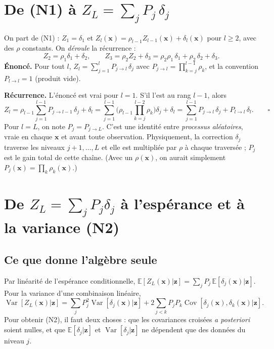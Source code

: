 \documentclass[10pt,a4paper]{article}
\newcommand{\vx}{\bm{x}}
\newcommand{\vz}{\bm{z}}
\DeclareMathOperator{\Var}{Var}
\DeclareMathOperator{\Cov}{Cov}
\begin{document}
\section{De (N1) à $Z_L=\sum_j P_j\,\delta_j$}\label{sec:deroule}
On part de (N1) : $Z_1=\delta_1$ et $Z_l(\vx)=\rho_{l-1}Z_{l-1}(\vx)+\delta_l(\vx)$ pour $l\ge2$, avec des
$\rho$ constants. On \emph{déroule} la récurrence :
\[
  Z_2=\rho_1\delta_1+\delta_2,\qquad
  Z_3=\rho_2 Z_2+\delta_3=\rho_2\rho_1\,\delta_1+\rho_2\,\delta_2+\delta_3 .
\]
\textbf{Énoncé.} Pour tout $l$, $Z_l=\sum_{j=1}^{l}P_{j\to l}\,\delta_j$ avec
$P_{j\to l}=\prod_{k=j}^{l-1}\rho_k$, et la convention $P_{l\to l}=1$ (produit vide).

\textbf{Récurrence.} L'énoncé est vrai pour $l=1$. S'il l'est au rang $l-1$, alors
\[
  Z_l=\rho_{l-1}\sum_{j=1}^{l-1}P_{j\to l-1}\,\delta_j+\delta_l
     =\sum_{j=1}^{l-1}\Big(\rho_{l-1}\prod_{k=j}^{l-2}\rho_k\Big)\delta_j+\delta_l
     =\sum_{j=1}^{l-1}P_{j\to l}\,\delta_j+P_{l\to l}\,\delta_l .\qquad\square
\]
Pour $l=L$, on note $P_j=P_{j\to L}$. C'est une identité entre \emph{processus aléatoires}, vraie en chaque
$\vx$ et avant toute observation. Physiquement, la correction $\delta_j$ traverse les niveaux $j+1,\dots,L$
et elle est multipliée par $\rho$ à chaque traversée ; $P_j$ est le gain total de cette chaîne. (Avec un
$\rho(\vx)$, on aurait simplement $P_j(\vx)=\prod_k\rho_k(\vx)$.)

\section{De $Z_L=\sum_j P_j\delta_j$ à l'espérance et à la variance (N2)}\label{sec:decomp}
\subsection{Ce que donne l'algèbre seule}
Par linéarité de l'espérance conditionnelle, $\mathbb{E}[Z_L(\vx)|\vz]=\sum_j P_j\,\mathbb{E}[\delta_j(\vx)|\vz]$.
Pour la variance d'une combinaison linéaire,
\begin{equation}\label{eq:var}
  \Var[Z_L(\vx)|\vz]=\sum_{j}P_j^2\Var[\delta_j(\vx)|\vz]
  +2\sum_{j<k}P_jP_k\Cov[\delta_j(\vx),\delta_k(\vx)|\vz].
\end{equation}
Pour obtenir (N2), il faut deux choses : que les covariances croisées \emph{a posteriori} soient nulles, et
que $\mathbb{E}[\delta_j|\vz]$ et $\Var[\delta_j|\vz]$ ne dépendent que des données du niveau $j$.
\end{document}
